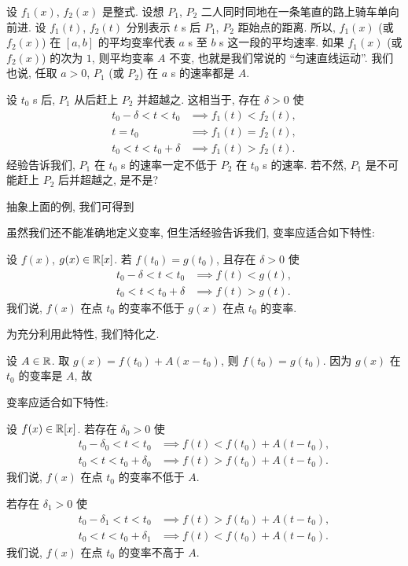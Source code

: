 \begin{example}
    设 $f_1 (x)$, $f_2 (x)$ 是整式. 设想 $P_1$, $P_2$ 二人同时同地在一条笔直的路上骑车单向前进. 设 $f_1 (t)$, $f_2 (t)$ 分别表示 $t$ s 后 $P_1$, $P_2$ 距始点的距离. 所以, $f_1 (x)$ (或 $f_2 (x)$) 在 $[a, b]$ 的平均变率代表 $a$ s 至 $b$ s 这一段的平均速率. 如果 $f_1 (x)$ (或 $f_2 (x)$) 的次为 $1$, 则平均变率 $A$ 不变, 也就是我们常说的 ``匀速直线运动''. 我们也说, 任取 $a > 0$, $P_1$ (或 $P_2$) 在 $a$ s 的速率都是 $A$.

    设 $t_0$ s 后, $P_1$ 从后赶上 $P_2$ 并超越之. 这相当于, 存在 $\delta > 0$ 使
    \begin{align*}
        t_0 - \delta < t < t_0 & \implies f_1 (t) < f_2 (t), \\
        t = t_0                & \implies f_1 (t) = f_2 (t), \\
        t_0 < t < t_0 + \delta & \implies f_1 (t) > f_2 (t).
    \end{align*}
    经验告诉我们, $P_1$ 在 $t_0$ s 的速率一定不低于 $P_2$ 在 $t_0$ s 的速率. 若不然, $P_1$ 是不可能赶上 $P_2$ 后并超越之, 是不是?
\end{example}

抽象上面的例, 我们可得到

\begin{proposition}
    虽然我们还不能准确地定义变率, 但生活经验告诉我们, 变率应适合如下特性:

    设 $f (x)$, $g (x) \in \mathbb{R}[x]$. 若 $f (t_0) = g (t_0)$, 且存在 $\delta > 0$ 使
    \begin{align*}
        t_0 - \delta < t < t_0 & \implies f (t) < g (t), \\
        t_0 < t < t_0 + \delta & \implies f (t) > g (t).
    \end{align*}
    我们说, $f (x)$ 在点 $t_0$ 的变率不低于 $g (x)$ 在点 $t_0$ 的变率.
\end{proposition}

为充分利用此特性, 我们特化之.

设 $A \in \mathbb{R}$. 取 $g(x) = f(t_0) + A (x - t_0)$, 则 $f(t_0) = g(t_0)$. 因为 $g(x)$ 在 $t_0$ 的变率是 $A$, 故

\begin{proposition}
    变率应适合如下特性:

    设 $f (x) \in \mathbb{R}[x]$. 若存在 $\delta_0 > 0$ 使
    \begin{align*}
        t_0 - \delta_0 < t < t_0 & \implies f (t) < f(t_0) + A (t - t_0), \\
        t_0 < t < t_0 + \delta_0 & \implies f (t) > f(t_0) + A (t - t_0).
    \end{align*}
    我们说, $f (x)$ 在点 $t_0$ 的变率不低于 $A$.

    若存在 $\delta_1 > 0$ 使
    \begin{align*}
        t_0 - \delta_1 < t < t_0 & \implies f (t) > f(t_0) + A (t - t_0), \\
        t_0 < t < t_0 + \delta_1 & \implies f (t) < f(t_0) + A (t - t_0).
    \end{align*}
    我们说, $f (x)$ 在点 $t_0$ 的变率不高于 $A$.
\end{proposition}

